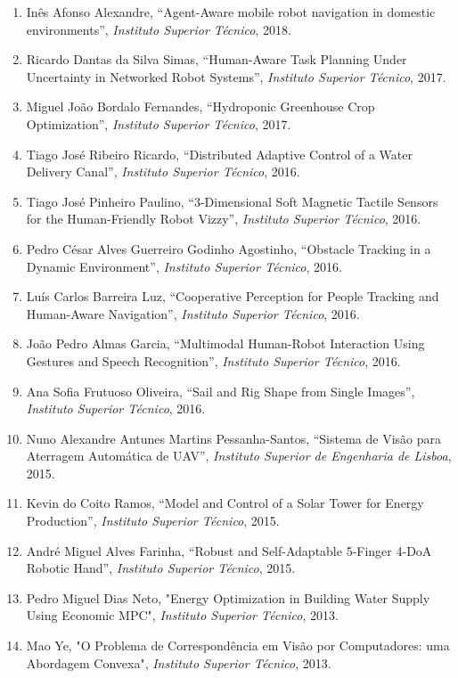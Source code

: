 \begin{enumerate}
  technologies'', \emph{Instituto Superior Técnico}, 2018.
\item
  Inês Afonso Alexandre, ``Agent-Aware mobile robot navigation in
  domestic environments'', \emph{Instituto Superior Técnico}, 2018.
\item
  Ricardo Dantas da Silva Simas, ``Human-Aware Task Planning Under
  Uncertainty in Networked Robot Systems'', \emph{Instituto Superior
  Técnico}, 2017.
\item
  Miguel João Bordalo Fernandes, ``Hydroponic Greenhouse Crop
  Optimization'', \emph{Instituto Superior Técnico}, 2017.
\item
  Tiago José Ribeiro Ricardo, ``Distributed Adaptive Control of a Water
  Delivery Canal'', \emph{Instituto Superior Técnico}, 2016.
\item
  Tiago José Pinheiro Paulino, ``3-Dimensional Soft Magnetic Tactile
  Sensors for the Human-Friendly Robot Vizzy'', \emph{Instituto Superior
  Técnico}, 2016.
\item
  Pedro César Alves Guerreiro Godinho Agostinho, ``Obstacle Tracking in
  a Dynamic Environment'', \emph{Instituto Superior Técnico}, 2016.
\item
  Luís Carlos Barreira Luz, ``Cooperative Perception for People Tracking
  and Human-Aware Navigation'', \emph{Instituto Superior Técnico}, 2016.
\item
  João Pedro Almas Garcia, ``Multimodal Human-Robot Interaction Using
  Gestures and Speech Recognition'', \emph{Instituto Superior Técnico},
  2016.
\item
  Ana Sofia Frutuoso Oliveira, ``Sail and Rig Shape from Single
  Images'', \emph{Instituto Superior Técnico}, 2016.
\item
  Nuno Alexandre Antunes Martins Pessanha-Santos, ``Sistema de Visão
  para Aterragem Automática de UAV'', \emph{Instituto Superior de
  Engenharia de Lisboa}, 2015.
\item
  Kevin do Coito Ramos, ``Model and Control of a Solar Tower for Energy
  Production'', \emph{Instituto Superior Técnico}, 2015.
\item
  André Miguel Alves Farinha, ``Robust and Self-Adaptable 5-Finger 4-DoA
  Robotic Hand'', \emph{Instituto Superior Técnico}, 2015.
\item
  Pedro Miguel Dias Neto, "Energy Optimization in Building Water Supply
  Using Economic MPC", \emph{Instituto Superior Técnico}, 2013.
\item
  Mao Ye, "O Problema de Correspondência em Visão por Computadores: uma
  Abordagem Convexa", \emph{Instituto Superior Técnico}, 2013.

\end{enumerate}
